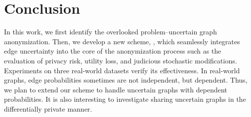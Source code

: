 \section{Conclusion}
In this work, we first identify the overlooked problem–uncertain graph anonymization. Then, we develop a new scheme, {\methodName}, which seamlessly integrates edge uncertainty into the core of the anonymization process such as the evaluation of privacy risk, utility loss, and judicious stochastic modifications. Experiments on three real-world datasets verify its effectiveness. In real-world graphs, edge probabilities sometimes are not independent, but dependent. Thus, we plan to extend our scheme to handle uncertain graphs with dependent probabilities. It is also interesting to investigate sharing uncertain graphs in the differentially private manner.